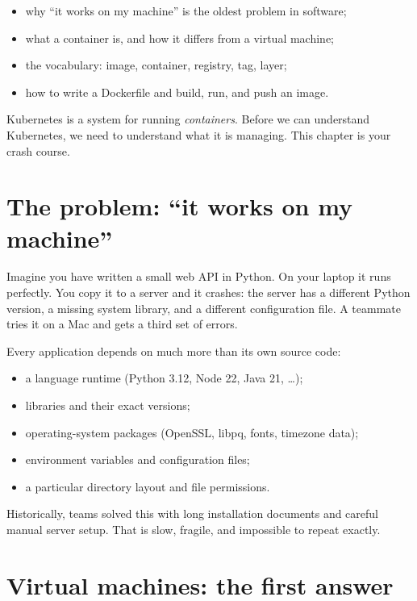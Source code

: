 
\begin{objectives}
\begin{itemize}
  \item why ``it works on my machine'' is the oldest problem in software;
  \item what a container is, and how it differs from a virtual machine;
  \item the vocabulary: image, container, registry, tag, layer;
  \item how to write a Dockerfile and build, run, and push an image.
\end{itemize}
\end{objectives}

Kubernetes is a system for running \emph{containers}. Before we can understand
Kubernetes, we need to understand what it is managing. This chapter is your
crash course.

\section{The problem: ``it works on my machine''}

Imagine you have written a small web API in Python. On your laptop it runs
perfectly. You copy it to a server and it crashes: the server has a different
Python version, a missing system library, and a different configuration file.
A teammate tries it on a Mac and gets a third set of errors.

Every application depends on much more than its own source code:

\begin{itemize}
  \item a language runtime (Python 3.12, Node 22, Java 21, \ldots);
  \item libraries and their exact versions;
  \item operating-system packages (OpenSSL, libpq, fonts, timezone data);
  \item environment variables and configuration files;
  \item a particular directory layout and file permissions.
\end{itemize}

Historically, teams solved this with long installation documents and careful
manual server setup. That is slow, fragile, and impossible to repeat exactly.

\section{Virtual machines: the first answer}

